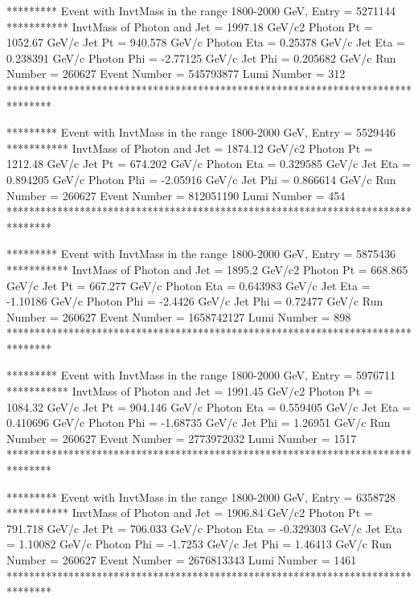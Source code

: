                                                                      
********* Event with InvtMass in the range 1800-2000 GeV, Entry = 5271144 ***********
InvtMass of Photon and Jet = 1997.18 GeV/c2
Photon Pt = 1052.67 GeV/c
Jet Pt = 940.578 GeV/c
Photon Eta = 0.25378 GeV/c
Jet Eta = 0.238391 GeV/c
Photon Phi = -2.77125 GeV/c
Jet Phi = 0.205682 GeV/c
Run Number = 260627
Event Number = 545793877
Lumi Number = 312
********************************************************************************
                                                                     
                                                                     
********* Event with InvtMass in the range 1800-2000 GeV, Entry = 5529446 ***********
InvtMass of Photon and Jet = 1874.12 GeV/c2
Photon Pt = 1212.48 GeV/c
Jet Pt = 674.202 GeV/c
Photon Eta = 0.329585 GeV/c
Jet Eta = 0.894205 GeV/c
Photon Phi = -2.05916 GeV/c
Jet Phi = 0.866614 GeV/c
Run Number = 260627
Event Number = 812051190
Lumi Number = 454
********************************************************************************
                                                                     
                                                                     
********* Event with InvtMass in the range 1800-2000 GeV, Entry = 5875436 ***********
InvtMass of Photon and Jet = 1895.2 GeV/c2
Photon Pt = 668.865 GeV/c
Jet Pt = 667.277 GeV/c
Photon Eta = 0.643983 GeV/c
Jet Eta = -1.10186 GeV/c
Photon Phi = -2.4426 GeV/c
Jet Phi = 0.72477 GeV/c
Run Number = 260627
Event Number = 1658742127
Lumi Number = 898
********************************************************************************
                                                                     
                                                                     
********* Event with InvtMass in the range 1800-2000 GeV, Entry = 5976711 ***********
InvtMass of Photon and Jet = 1991.45 GeV/c2
Photon Pt = 1084.32 GeV/c
Jet Pt = 904.146 GeV/c
Photon Eta = 0.559405 GeV/c
Jet Eta = 0.410696 GeV/c
Photon Phi = -1.68735 GeV/c
Jet Phi = 1.26951 GeV/c
Run Number = 260627
Event Number = 2773972032
Lumi Number = 1517
********************************************************************************
                                                                     
                                                                     
********* Event with InvtMass in the range 1800-2000 GeV, Entry = 6358728 ***********
InvtMass of Photon and Jet = 1906.84 GeV/c2
Photon Pt = 791.718 GeV/c
Jet Pt = 706.033 GeV/c
Photon Eta = -0.329303 GeV/c
Jet Eta = 1.10082 GeV/c
Photon Phi = -1.7253 GeV/c
Jet Phi = 1.46413 GeV/c
Run Number = 260627
Event Number = 2676813343
Lumi Number = 1461
********************************************************************************
                                                                     
